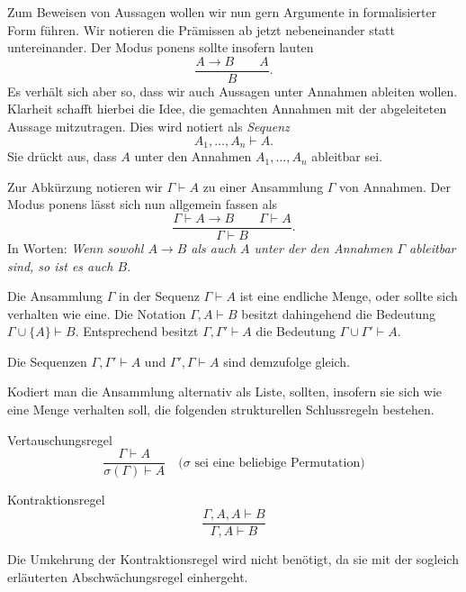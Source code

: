 \documentclass[8pt]{beamer}
\newcommand{\parspace}{\vspace{0.8em}}
\newcommand{\cond}{\rightarrow}
\begin{document}
\begin{frame}
Zum Beweisen von Aussagen wollen wir nun gern Argumente in formalisierter
Form führen. Wir notieren die Prämissen ab jetzt nebeneinander statt
untereinander. Der Modus ponens sollte insofern lauten
\[\frac{A\cond B\qquad A}{B}.\]\pause
Es verhält sich aber so, dass wir auch Aussagen unter Annahmen ableiten
wollen. Klarheit schafft hierbei die Idee, die gemachten Annahmen
mit der abgeleiteten Aussage mitzutragen. Dies wird notiert als
\emph{Sequenz}
\[A_1,\ldots,A_n\vdash A.\]
Sie drückt aus, dass $A$ unter den Annahmen $A_1,\ldots,A_n$
ableitbar sei.\pause

\parspace
Zur Abkürzung notieren wir $\Gamma\vdash A$ zu einer Ansammlung
$\Gamma$ von Annahmen. Der Modus ponens lässt sich nun allgemein fassen als
\[\frac{\Gamma\vdash A\cond B\qquad\Gamma\vdash A}{\Gamma\vdash B}.\]
In Worten: \emph{Wenn sowohl $A\cond B$ als auch $A$ unter der den
Annahmen $\Gamma$ ableitbar sind, so ist es auch $B$.}
\end{frame}

\begin{frame}
Die Ansammlung $\Gamma$ in der Sequenz $\Gamma\vdash A$ ist eine endliche
Menge, oder sollte sich verhalten wie eine. Die Notation $\Gamma,A\vdash B$
besitzt dahingehend die Bedeutung $\Gamma\cup\{A\}\vdash B$. Entsprechend
besitzt $\Gamma,\Gamma'\vdash A$ die Bedeutung $\Gamma\cup\Gamma'\vdash A$.\pause

\parspace
Die Sequenzen $\Gamma,\Gamma'\vdash A$ und $\Gamma',\Gamma\vdash A$
sind demzufolge gleich.\pause

\parspace
Kodiert man die Ansammlung alternativ als Liste, sollten, insofern sie
sich wie eine Menge verhalten soll, die folgenden
strukturellen Schlussregeln bestehen.

\begin{block}{Vertauschungsregel}
\[\dfrac{\Gamma\vdash A}{\sigma(\Gamma)\vdash A}\quad\text{($\sigma$ sei eine beliebige Permutation)}\]
\end{block}

\begin{block}{Kontraktionsregel}
\[\dfrac{\Gamma,A,A\vdash B}{\Gamma,A\vdash B}\]
\end{block}

Die Umkehrung der Kontraktionsregel wird nicht benötigt, da sie mit
der sogleich erläuterten Abschwächungsregel einhergeht.
\end{frame}
\end{document}
